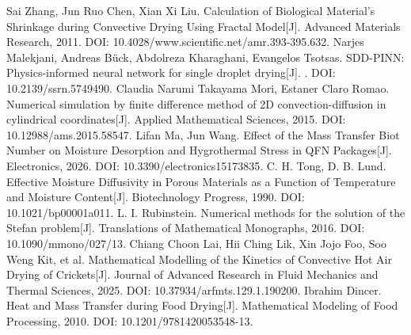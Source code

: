  Sai Zhang, Jun Ruo Chen, Xian Xi Liu. Calculation of Biological Material's Shrinkage during Convective Drying Using Fractal Model[J]. Advanced Materials Research, 2011. DOI: 10.4028/www.scientific.net/amr.393-395.632.
 Narjes Malekjani, Andreas Bück, Abdolreza Kharaghani, Evangelos Tsotsas. SDD-PINN: Physics-informed neural network for single droplet drying[J]. . DOI: 10.2139/ssrn.5749490.
 Claudia Narumi Takayama Mori, Estaner Claro Romao. Numerical simulation by finite difference method of 2D convection-diffusion in cylindrical coordinates[J]. Applied Mathematical Sciences, 2015. DOI: 10.12988/ams.2015.58547.
 Lifan Ma, Jun Wang. Effect of the Mass Transfer Biot Number on Moisture Desorption and Hygrothermal Stress in QFN Packages[J]. Electronics, 2026. DOI: 10.3390/electronics15173835.
 C. H. Tong, D. B. Lund. Effective Moisture Diffusivity in Porous Materials as a Function of Temperature and Moisture Content[J]. Biotechnology Progress, 1990. DOI: 10.1021/bp00001a011.
 L. I. Rubinstein. Numerical methods for the solution of the Stefan problem[J]. Translations of Mathematical Monographs, 2016. DOI: 10.1090/mmono/027/13.
 Chiang Choon Lai, Hii Ching Lik, Xin Jojo Foo, Soo Weng Kit, et al. Mathematical Modelling of the Kinetics of Convective Hot Air Drying of Crickets[J]. Journal of Advanced Research in Fluid Mechanics and Thermal Sciences, 2025. DOI: 10.37934/arfmts.129.1.190200.
 Ibrahim Dincer. Heat and Mass Transfer during Food Drying[J]. Mathematical Modeling of Food Processing, 2010. DOI: 10.1201/9781420053548-13.